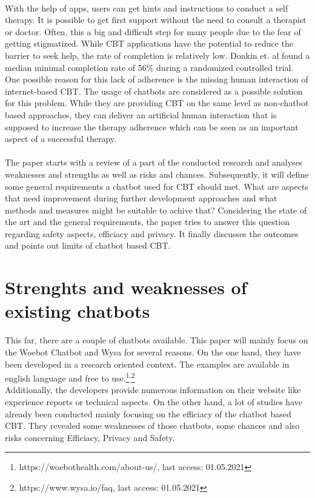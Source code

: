 \documentclass[sigconf, nonacm]{acmart}
\begin{document}
\\
With the help of apps, users can get hints and instructions to conduct a self therapy. It is possible
to get first support without the need to consult a therapist or doctor. Often, this a big and 
difficult step for many people due to the fear of getting stigmatized\cite{Rossler2016}.
While CBT applications have the potential to reduce the barrier to seek help, the rate of completion
is relatively low. Donkin et. al found a median minimal completion rate of 56\% during a randomized controlled trial\cite{Donkin}. 
One possible reason for this lack of adherence is the missing human interaction of internet-based CBT\cite{Ly2017}.
The usage of chatbots are considered as a possible solution for this problem. While they are providing CBT on the same level 
as non-chatbot based approaches, they can deliver an artificial human interaction that is supposed to increase the
therapy adherence which can be seen as an important aspect of a successful therapy. 
\\\\
The paper starts with a review of a part of the conducted research and analyses weaknesses and strengths as well as risks and chances. 
Subsequently, it will define some general requirements a chatbot used for CBT should met.
What are aspects that need improvement during further development approaches and what methods and measures might be suitable to achive that? 
Considering the state of the art and the general requirements, the paper tries to answer this question regarding safety aspects, efficiacy and privacy.
It finally discusses the outcomes and points out limits of chatbot based CBT.



\section{Strenghts and weaknesses of existing chatbots}
This far, there are a couple of chatbots available. This paper will mainly focus on the Woebot Chatbot and Wysa for several reasons.
On the one hand, they have been developed in a research oriented context. 
The examples are available in english language and free to use.\footnote{https://woebothealth.com/about-us/, last access: 01.05.2021}\textsuperscript{,}\footnote{https://www.wysa.io/faq, last access: 01.05.2021}
\\
Additionally, the developers provide numerous information on their website
like experience reports or technical aspects.
On the other hand, a lot of studies have already been conducted mainly focusing on the efficiacy of the chatbot based CBT. 
They revealed some weaknesses of those chatbots, some chances and also risks concerning Efficiacy, Privacy and Safety.
\end{document}
